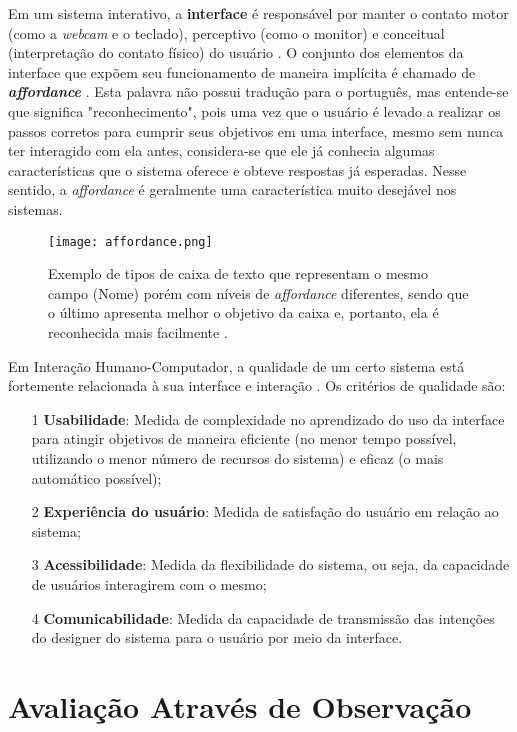 \indent Em um sistema interativo, a \textbf{interface} é responsável por manter o contato motor (como a \textit{webcam} e o teclado), perceptivo (como o monitor) e conceitual (interpretação do contato físico) do usuário \cite[p. 25]{IHCbook}. O conjunto dos elementos da interface que expõem seu funcionamento de maneira implícita é chamado de \textbf{\textit{affordance}} \cite[p. 27]{IHCbook}. Esta palavra não possui tradução para o português, mas entende-se que significa "reconhecimento", pois uma vez que o usuário é levado a realizar os passos corretos para cumprir seus objetivos em uma interface, mesmo sem nunca ter interagido com ela antes, considera-se que ele já conhecia algumas características que o sistema oferece e obteve respostas já esperadas. Nesse sentido, a \textit{affordance} é geralmente uma característica muito desejável nos sistemas.

\begin{figure}[!h]
    \centering
    \texttt{[image: affordance.png]}
    \caption{Exemplo de tipos de caixa de texto que representam o mesmo campo (Nome) porém com níveis de \textit{affordance} diferentes, sendo que o último apresenta melhor o objetivo da caixa e, portanto, ela é reconhecida mais facilmente \cite{affordance}.}
    \label{fig:Affordance}
\end{figure} 

\indent Em Interação Humano-Computador, a qualidade de um certo sistema está fortemente relacionada à sua interface e interação \cite[p. 28]{IHCbook}. Os critérios de qualidade são:
\begin{itemize}
\item[1] \textbf{Usabilidade}: Medida de complexidade no aprendizado do uso da interface para atingir objetivos de maneira eficiente (no menor tempo possível, utilizando o menor número de recursos do sistema) e eficaz (o mais automático possível);
\item[2] \textbf{Experiência do usuário}: Medida de satisfação do usuário em relação ao sistema;
\item[3] \textbf{Acessibilidade}: Medida da flexibilidade do sistema, ou seja, da capacidade de usuários interagirem com o mesmo;
\item[4] \textbf{Comunicabilidade}: Medida da capacidade de transmissão das intenções do designer do sistema para o usuário por meio da interface. %
\end{itemize}

\section{Avaliação Através de Observação}

